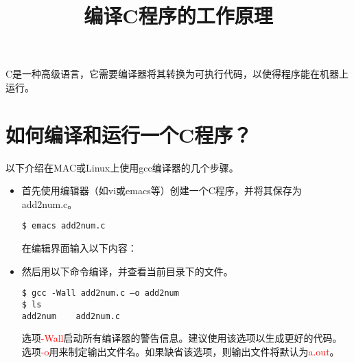 \documentclass[10pt,a4paper%
tablecaptionabove]{article}
\newcommand{\red}{\textcolor{red}}
\begin{document}
\begin{CJK}{UTF8}{gkai}


 

\newtheorem{li}{例}
\newtheorem{jielun}{结论}
\newtheorem{dingli}{定理}
\newtheorem{mingti}{{命题}} 
\newtheorem{yinli}{{引理}} 
\newtheorem{tuilun}{{推论}}
\newtheorem{dingyi}{{定义}} 
\newtheorem{example}{{例}}
\newtheorem*{example*}{{例}}
\newtheorem*{jie}{{解}}
\newtheorem*{zhengming}{{证明}}
\newtheorem{zhu}{{注}}
\newtheorem*{zhu*}{{注}}
\newtheorem{xingzhi}{{性质}}
\newtheorem{wenti}{{问题}}
\newtheorem{rem}{{Remark}}
\newtheorem{lem}{{Lemma}}
\pagestyle{plain}




\title{编译C程序的工作原理}
\maketitle

C是一种高级语言，它需要编译器将其转换为可执行代码，以使得程序能在机器上运行。 

\section{如何编译和运行一个C程序？}

以下介绍在MAC或Linux上使用gcc编译器的几个步骤。

\begin{itemize}

\item 首先使用编辑器（如vi或emacs等）创建一个C程序，并将其保存为add2num.c。

\begin{lstlisting}[backgroundcolor=\color{red!10}]
$ emacs add2num.c
\end{lstlisting}
在编辑界面输入以下内容：


\item 然后用以下命令编译，并查看当前目录下的文件。
\begin{lstlisting}[backgroundcolor=\color{red!10}]
$ gcc -Wall add2num.c –o add2num
$ ls
add2num    add2num.c
\end{lstlisting}
选项\red{\ttfamily -Wall}启动所有编译器的警告信息。建议使用该选项以生成更好的代码。 选项\red{\ttfamily -o}用来制定输出文件名。如果缺省该选项，则输出文件将默认为\red{\ttfamily a.out}。


\end{itemize}
\end{CJK}
\end{document}

